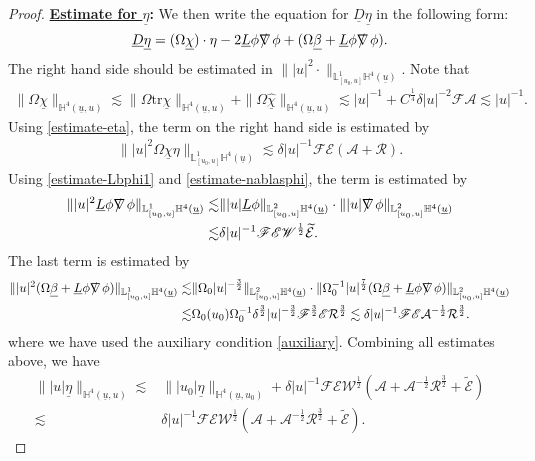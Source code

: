 \documentclass[11pt,reqno]{amsart}
\theoremstyle{definition}
\numberwithin{equation}{section}
\newcommand{\tr}{\mathrm{tr}}
\renewcommand{\L}{\mathbb{L}}
\renewcommand{\H}{\mathbb{H}}
\def\betab{\underline{\beta}}
\def\chib{\underline{\chi}}
\def\chibh{\widehat{\underline{\chi}}}
\def\etab{\underline{\eta}}
\def\Lb{\underline{L}}
\def\tr{\mathrm{tr}}
\def\ub{\underline{u}}
\newcommand{\Db}{\underline{D}}
\def\nablas{\mbox{$\nabla \mkern -13mu /$ }}
\begin{document}
\begin{proof}
{\bf \underline{Estimate for $\etab$}:} We then write the equation for $\Db\etab$ in the following form:
\begin{equation}\label{equ-Dbetab}
\Db\etab = (\Omega\chib) \cdot\eta-2\Lb\phi\nablas\phi+(\Omega\betab+\Lb\phi\nablas\phi).
\end{equation}
The right hand side should be estimated in $\||u|^2\cdot\|_{\L^1_{[u_0,u]}\H^4(\ub)}$. Note that
\begin{align*}
\|\Omega\chib\|_{\H^4(\ub,u)}\lesssim\|\Omega\tr\chib\|_{\H^4(\ub,u)}+\|\Omega\chibh\|_{\H^4(\ub,u)}\lesssim|u|^{-1}+C^{\frac{1}{4}}\delta|u|^{-2}\mathscr{F}\mathcal{A}\lesssim|u|^{-1}.
\end{align*}
Using \eqref{estimate-eta}, the  term on the right hand side is estimated by
\begin{align*}
\||u|^2\Omega\chib\eta\|_{\L^1_{[u_0,u]}\H^4(\ub)}\lesssim\delta|u|^{-1}\mathscr{F}\mathscr{E}(\mathcal{A}+\mathcal{R}).
\end{align*}
Using \eqref{estimate-Lbphi1} and \eqref{estimate-nablasphi}, the  term is estimated by
\begin{align*}
\||u|^2\Lb\phi\nablas\phi\|_{\L^1_{[u_0,u]}\H^4(\ub)}\lesssim&\||u|\Lb\phi\|_{\L^2_{[u_0,u]}\H^4(\ub)}\cdot\||u|\nablas\phi\|_{\L^2_{[u_0,u]}\H^4(\ub)}\\
\lesssim&\delta|u|^{-1}\mathscr{F}\mathscr{E}\mathscr{W}^{\frac{1}{2}}\widetilde{\mathcal{E}}.
\end{align*}
The last term is estimated by
\begin{align*}
\||u|^2(\Omega\betab+\Lb\phi\nablas\phi)\|_{\L^1_{[u_0,u]}\H^4(\ub)}\lesssim&\|\Omega_0|u|^{-\frac{3}{2}}\|_{\L^2_{[u_0,u]}\H^4(\ub)}\cdot\|\Omega_0^{-1}|u|^{\frac{7}{2}}(\Omega\betab+\Lb\phi\nablas\phi)\|_{\L^2_{[u_0,u]}\H^4(\ub)}\\
\lesssim&\Omega_0(u_0)\Omega_0^{-1}\delta^{\frac{3}{2}}|u|^{-\frac{3}{2}}\mathscr{F}^{\frac{3}{2}}\mathscr{E}\mathcal{R}^{\frac{3}{2}}\lesssim\delta|u|^{-1}\mathscr{F}\mathscr{E}\mathcal{A}^{-\frac{1}{2}}\mathcal{R}^{\frac{3}{2}}.
\end{align*}
where we have used the auxiliary condition \eqref{auxiliary}. Combining all estimates above, we have
\begin{equation}\label{estimate-etab}
\begin{split}
\||u|\etab\|_{\H^4(\ub,u)}\lesssim&\||u_0|\etab\|_{\H^4(\ub,u_0)}+\delta|u|^{-1}\mathscr{F}\mathscr{E}\mathscr{W}^{\frac{1}{2}}(\mathcal{A}+\mathcal{A}^{-\frac{1}{2}}\mathcal{R}^{\frac{3}{2}}+\widetilde{\mathcal{E}})\\\lesssim&\delta|u|^{-1}\mathscr{F}\mathscr{E}\mathscr{W}^{\frac{1}{2}}(\mathcal{A}+\mathcal{A}^{-\frac{1}{2}}\mathcal{R}^{\frac{3}{2}}+\widetilde{\mathcal{E}}).
\end{split}
\end{equation}



\end{proof}
\end{document}
